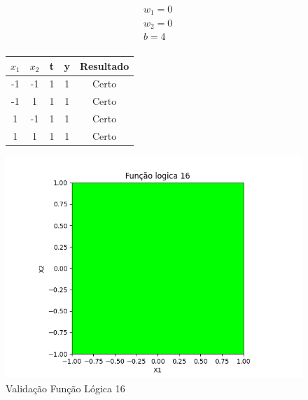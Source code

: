 \begin{figure}[h!]
\centering
\begin{minipage}[c]{0.49\linewidth}
\centering
\[
\begin{aligned}
&w_1 = 0\\
&w_2 = 0\\
&b = 4\\
\end{aligned}
\]
\begin{tabular}{|c|c|c|c|c|}\hline
$x_1$ & $x_2$ & t & y & Resultado\\ \hline
 -1 & -1 & 1 & 1 & Certo\\ \hline
 -1 & 1 & 1 & 1 & Certo\\ \hline
 1 & -1 & 1 & 1 & Certo\\ \hline
 1 & 1 & 1 & 1 & Certo\\ \hline
\end{tabular}
\end{minipage}
\hfill
\begin{minipage}[c]{0.5\linewidth}
\centering
\singlespacing
\includegraphics[width=1.2\textwidth]{im/im16}
\end{minipage}
\caption{Validação Função Lógica 16}
\label{vl16}
\end{figure}

